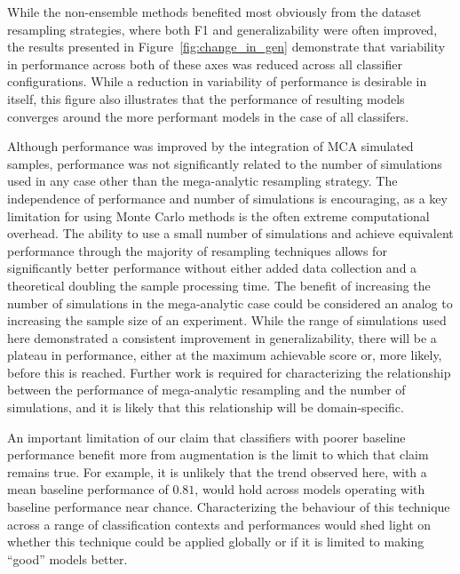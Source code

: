 \documentclass[10pt]{SelfArx} %
\begin{document}
While the non-ensemble methods benefited most obviously from the dataset resampling strategies, where both F1 and
generalizability were often improved, the results presented in Figure~\ref{fig:change_in_gen} demonstrate that
variability in performance across both of these axes was reduced across all classifier configurations. While a
reduction in variability of performance is desirable in itself, this figure also illustrates that the performance of
resulting models converges around the more performant models in the case of all classifers.

Although performance was improved by the integration of MCA simulated samples, performance was not significantly
related to the number of simulations used in any case other than the mega-analytic resampling strategy. The
independence of performance and number of simulations is encouraging, as a key limitation for using Monte Carlo methods
is the often extreme computational overhead. The ability to use a small number of simulations and achieve equivalent
performance through the majority of resampling techniques allows for significantly better performance without either
added data collection and a theoretical doubling the sample processing time. The benefit of increasing the number of
simulations in the mega-analytic case could be considered an analog to increasing the sample size of an experiment.
While the range of simulations used here demonstrated a consistent improvement in generalizability, there will be a
plateau in performance, either at the maximum achievable score or, more likely, before this is reached. Further
work is required for characterizing the relationship between the performance of mega-analytic resampling and the number
of simulations, and it is likely that this relationship will be domain-specific.

An important limitation of our claim that classifiers with poorer baseline performance benefit more from augmentation
is the limit to which that claim remains true. For example, it is unlikely that the trend observed here, with a mean
baseline performance of $0.81$, would hold across models operating with baseline performance near chance.
Characterizing the behaviour of this technique across a range of classification contexts and performances would shed
light on whether this technique could be applied globally or if it is limited to making ``good'' models better.
\end{document}

